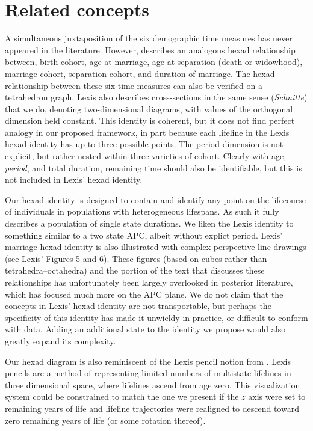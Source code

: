 \documentclass[12pt,oneside,a4paper]{article} %
\begin{document}
\FloatBarrier
\section{Related concepts}
A simultaneous juxtaposition of
the six demographic time measures has never appeared in the literature. However,
\citet{lexis1875einleitung} describes an analogous hexad relationship between,
birth cohort, age at marriage, age at separation (death or widowhood), marriage cohort, separation cohort, and
duration of marriage. The hexad relationship between these six
time measures can also be verified on a tetrahedron graph. Lexis also describes
cross-sections in the same sense (\textit{Schnitte}) that we do, denoting
two-dimensional diagrams, with values of the orthogonal dimension held constant.
This identity is coherent, but it does not find perfect
analogy in our proposed framework, in part because each lifeline in the Lexis
hexad identity has up to three possible points. The period dimension is
not explicit, but rather nested within three varieties of cohort.
Clearly with age, \textit{period}, and total duration, remaining
time should also be identifiable, but this is not included in Lexis' hexad
identity. 

Our hexad identity is designed to contain and identify any point on
the lifecourse of individuals in populations with heterogeneous
lifespans. As such it fully describes a population of single state durations.
We liken the Lexis identity to something similar to a two state APC, albeit
without explict period. Lexis' marriage hexad identity is also
illustrated with complex perspective line drawings (see Lexis' Figures 5 and 6).
These figures (based on cubes rather than tetrahedra--octahedra) and the portion of
the text that discusses these relationships has unfortunately been largely
overlooked in posterior literature, which has focused much more on the APC
plane. We do not claim that the concepts in Lexis' hexad
identity are not transportable, but perhaps the specificity of this identity has
made it unwieldy in practice, or difficult to conform with data. Adding an
additional state to the identity we propose would also greatly expand its
complexity.

Our hexad diagram is also reminiscent of the Lexis pencil notion from
\citet{francis1996visualization}. Lexis pencils are a method of representing
limited numbers of multistate lifelines in three dimensional space, where
lifelines ascend from age zero. This visualization system could be constrained
to match the one we present if the $z$ axis were set to remaining years of life
and lifeline trajectories were realigned to descend toward zero remaining years
of life (or some rotation thereof).
\end{document}
